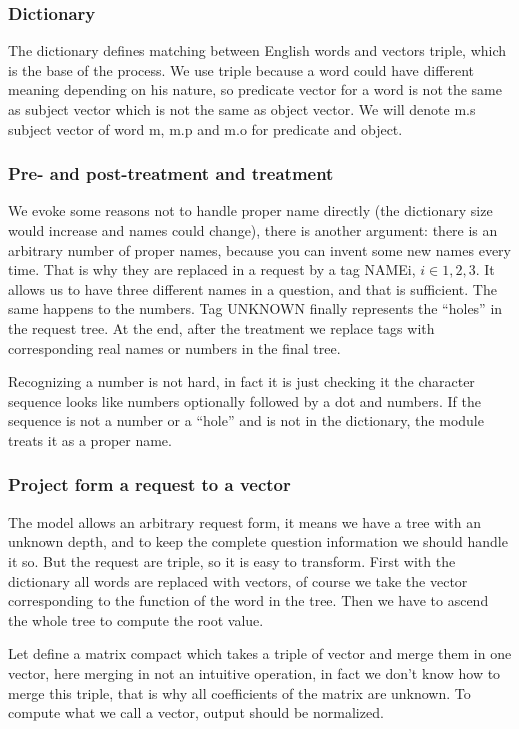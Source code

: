 \subsubsection{Dictionary}

The dictionary defines matching between English words and vectors triple, which is the base of the process. We use triple because a word could have different meaning depending on his nature, so predicate vector for a word is not the same as subject vector which is not the same as object vector. We will denote m.s subject vector of word m, m.p and m.o for predicate and object.

\subsubsection{Pre- and post-treatment and treatment}

We evoke some reasons not to handle proper name directly (the dictionary size would increase and names could change), there is another argument: there is an arbitrary number of proper names, because you can invent some new names every time. That is why they are replaced in a request by a tag NAMEi, $i\in{1,2,3}$. It allows us to have three different names in a question, and that is sufficient. The same happens to the numbers. Tag UNKNOWN finally represents the ``holes'' in the request tree. At the end, after the treatment we replace tags with corresponding real names or numbers in the final tree.

Recognizing a number is not hard, in fact it is just checking it the character sequence looks like numbers optionally followed by a dot and numbers. If the sequence is not a number or a ``hole'' and is not in the dictionary, the module treats it as a proper name.

\subsubsection{Project form a request to a vector}

The model allows an arbitrary request form, it means we have a tree with an unknown depth, and to keep the complete question information we should handle it so. But the request are triple, so it is easy to transform. First with the dictionary all words are replaced with vectors, of course we take the vector corresponding to the function of the word in the tree. Then we have to ascend the whole tree to compute the root value.

Let define a matrix compact which takes a triple of vector and merge them in one vector, here merging in not an intuitive operation, in fact we don't know how to merge this triple, that is why all coefficients of the matrix are unknown. To compute what we call a vector, output should be normalized.

